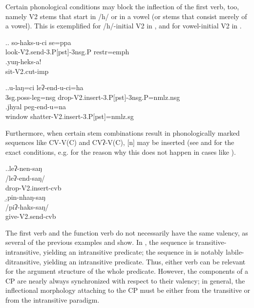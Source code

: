 Certain phonological conditions may block the inflection of the first verb, too, namely V2 stems that start in  /h/ or in a vowel (or stems that consist merely of a vowel). This is exemplified for /h/-initial V2 in \Next, and for vowel-initial V2 in \NNext.

\ex.\ag. so-haks-u-ci se=ppa\\
look{\sc -V2.send-3.P[pst]-3nsg.P} {\sc restr=emph}\\
 
\bg.yuŋ-heks-a!\\
sit{\sc -V2.cut-imp}\\


\ex.\ag.u-laŋ=ci leʔ-end-u-ci=ha\\
{\sc 3sg.poss-}leg{\sc =nsg} drop{\sc -V2.insert-3.P[pst]-3nsg.P=nmlz.nsg}\\
\bg.jhyal peg-end-u=na\\
window shatter{\sc -V2.insert-3.P[pst]=nmlz.sg}\\

Furthermore, when  certain stem combinations result in phonologically marked sequences like CV-V(C) and CVʔ-V(C), [n] may be inserted (see  \Next and   for the exact conditions, e.g. for the reason why this does not happen in cases like \Last[a]).

\ex.\a.\glll leʔ-nen-saŋ\\
/leʔ-end-saŋ/\\
drop{\sc -V2.insert-cvb}\\
\b.\glll pin-nhaŋ-saŋ\\
/piʔ-haks-saŋ/\\
give{\sc -V2.send-cvb}\\


The first verb and the function verb do not necessarily have the same valency, as several of the previous examples and \Next show. In \Next[a], the sequence is transitive-intransitive, yielding an intransitive predicate; the sequence in \Next[b]  is notably labile-ditransitive, yielding an intransitive predicate. Thus, either  verb can be relevant for the argument structure of the whole predicate. However, the components of a CP are nearly always synchronized with respect to their valency; in general, the inflectional morphology attaching to the CP must be either from the transitive or from the intransitive paradigm. 


